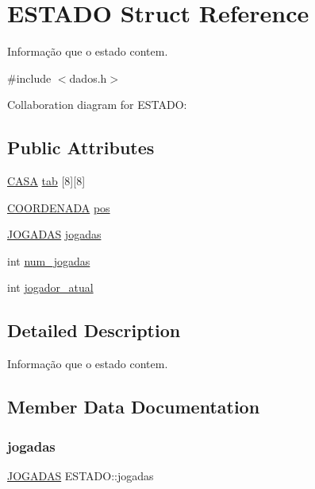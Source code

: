 \hypertarget{structESTADO}{}\section{E\+S\+T\+A\+DO Struct Reference}
\label{structESTADO}


Informação que o estado contem.  




{\ttfamily \#include $<$dados.\+h$>$}



Collaboration diagram for E\+S\+T\+A\+DO\+:
\subsection*{Public Attributes}
\begin{DoxyCompactItemize}
\item 
\hyperlink{dados_8h_aba91601f16d4c485b2d9b8c429f27039}{C\+A\+SA} \hyperlink{structESTADO_ab56f0f1be16954d3768b4174d14c087d}{tab} \mbox{[}8\mbox{]}\mbox{[}8\mbox{]}
\item 
\hyperlink{structCOORDENADA}{C\+O\+O\+R\+D\+E\+N\+A\+DA} \hyperlink{structESTADO_ab1bb13e4a70f2464766c57e64b9c78f9}{pos}
\item 
\hyperlink{dados_8h_a92f70ff132400975cac8cc88719163e5}{J\+O\+G\+A\+D\+AS} \hyperlink{structESTADO_afae43b87a488fad0f2b56a18bad31d18}{jogadas}
\item 
int \hyperlink{structESTADO_a261495728744647e618b4e623f5a4b7a}{num\+\_\+jogadas}
\item 
int \hyperlink{structESTADO_a5dd28e2e68b7aef2b6b7ea88e02eff58}{jogador\+\_\+atual}
\end{DoxyCompactItemize}


\subsection{Detailed Description}
Informação que o estado contem. 

\subsection{Member Data Documentation}
\mbox{\label{structESTADO_afae43b87a488fad0f2b56a18bad31d18}} 
\subsubsection{\texorpdfstring{jogadas}{jogadas}}
{\footnotesize\ttfamily \hyperlink{dados_8h_a92f70ff132400975cac8cc88719163e5}{J\+O\+G\+A\+D\+AS} E\+S\+T\+A\+D\+O\+::jogadas}

